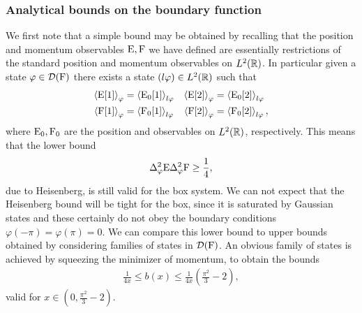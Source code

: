 \subsubsection{Analytical bounds on the boundary function}
\label{subsubsec:box-ur-analytical-bounds}
We first note that a simple bound may be obtained by recalling that the position and momentum observables $\operatorname{E},\operatorname{F}$ we have defined are essentially restrictions of the standard position and momentum observables on $L^2(\mathbb{R})$. In particular given a state $\varphi\in\mathcal{D}(\operatorname{F})$ there exists a state $(l\varphi)\in L^2(\mathbb{R})$ such that
\begin{align}
  \left\langle{\operatorname{E}[1]}\right\rangle_{\varphi} &= \left\langle{\operatorname{E}_0[1]}\right\rangle_{l\varphi} & \left\langle{\operatorname{E}[2]}\right\rangle_{\varphi} &= \left\langle{\operatorname{E}_0[2]}\right\rangle_{l\varphi}\\
  \left\langle{\operatorname{F}[1]}\right\rangle_{\varphi} &= \left\langle{\operatorname{F}_0[1]}\right\rangle_{l\varphi} & \left\langle{\operatorname{F}[2]}\right\rangle_{\varphi} &= \left\langle{\operatorname{F}_0[2]}\right\rangle_{l\varphi},
\end{align}
where $\operatorname{E}_0, \operatorname{F}_0$ are the position and observables on $L^2(\mathbb{R})$, respectively. This means that the lower bound
\begin{align}\label{eqn:box-ur-hesenberg-is-a-lower-bound}
  \var[\varphi]{\ope}\var[\varphi]{\opf} \geq \frac{1}{4},
\end{align}
due to Heisenberg, is still valid for the box system. We can not expect that the Heisenberg bound will be tight for the box, since it is saturated by Gaussian states and these certainly do not obey the boundary conditions $\varphi(-\pi) = \varphi(\pi) = 0$. We can compare this lower bound to upper bounds obtained by considering families of states in $\mathcal{D}(\operatorname{F})$. An obvious family of states is achieved by squeezing the minimizer of momentum, to obtain the bounds
\begin{align}
  \frac{1}{4x}\leq b(x) \leq \frac{1}{4x}\left(\frac{\pi^2}{3}-2\right),
\end{align}
valid for $x\in\left(0, \frac{\pi^2}{3}-2\right)$. 

